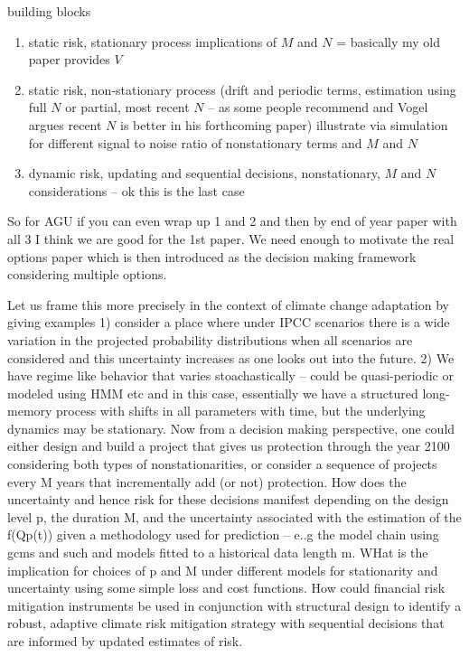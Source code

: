 \documentclass[11pt]{article}
\begin{document}
building blocks
\begin{enumerate}
  \item static risk, stationary process implications of $M$ and $N$ = basically my old paper provides $V$
  \item static risk, non-stationary process (drift and periodic terms, estimation using full $N$ or partial, most recent $N$ -- as some people recommend and Vogel argues recent $N$ is better in his forthcoming paper) illustrate via simulation for different signal to noise ratio of nonstationary terms and $M$ and $N$
  \item dynamic risk, \ie updating and sequential decisions, nonstationary, $M$ and $N$ considerations -- ok this is the last case
\end{enumerate}
So for AGU if you can even wrap up 1 and 2 and then by end of year paper with all 3 I think we are good for the 1st paper.
We need enough to motivate the real options paper which is then introduced as the decision making framework considering multiple options.

Let us frame this more precisely in the context of climate change adaptation by giving examples
1) consider a place where under IPCC scenarios there is a wide variation in the projected probability distributions when all scenarios are considered and this uncertainty increases as one looks out into the future.
2) We have regime like behavior that varies stoachastically -- could be quasi-periodic or modeled using HMM etc and in this case, essentially we have a structured long-memory process with shifts in all parameters with time, but the underlying dynamics may be stationary.
Now from a decision making perspective, one could either design and build a project that gives us protection through the year 2100 considering both types of nonstationarities, or consider a sequence of projects every M years that incrementally add (or not) protection. How does the uncertainty and hence risk for these decisions manifest depending on the design level p, the duration M, and the uncertainty associated with the estimation of the f(Qp(t)) given a methodology used for prediction -- e..g the model chain using gcms and such and models fitted to a historical data length m.
WHat is the implication for choices of p and M under different models for stationarity and uncertainty using some simple loss and cost  functions. How could  financial risk mitigation instruments be used in conjunction with structural design to identify a robust, adaptive climate risk mitigation strategy with sequential decisions that are informed by updated estimates of risk.
\end{document}
